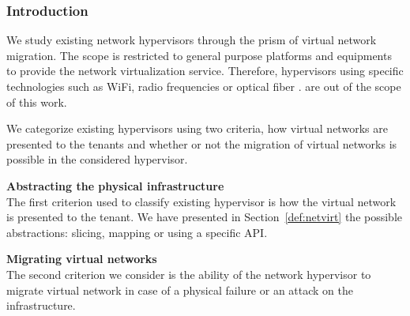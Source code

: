 \subsubsection{Introduction}
We study existing network hypervisors through the prism of virtual network migration.
The scope is restricted to general purpose platforms and equipments to provide the network virtualization service. Therefore, hypervisors using specific technologies such as WiFi, radio frequencies or optical fiber \etc. are out of the scope of this work.

We categorize existing hypervisors using two criteria, how virtual networks are presented to the tenants and whether or not the migration of virtual networks is possible in the considered hypervisor.

\textbf{Abstracting the physical infrastructure\\}
The first criterion used to classify existing hypervisor is how the virtual network is presented to the tenant. We have presented in Section~\ref{def:netvirt} the possible abstractions: slicing, mapping or using a specific API. 

\textbf{Migrating virtual networks\\}
The second criterion we consider is the ability of the network hypervisor to migrate virtual network in case of a physical failure or an attack on the infrastructure.


